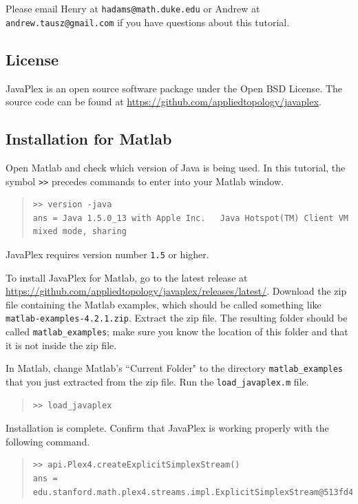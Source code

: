 \documentclass[amscd, amssymb, verbatim]{amsart}[12pt]
\theoremstyle{remark}
\theoremstyle{remark}
\theoremstyle{remark}
\begin{document}
Please email Henry at \texttt{hadams@math.duke.edu} or Andrew at \texttt{andrew.tausz@gmail.com} if you have questions about this tutorial.


\subsection{License}

JavaPlex is an open source software package under the Open BSD License. The source code can be found at \url{https://github.com/appliedtopology/javaplex}.


\subsection{Installation for Matlab}
Open Matlab and check which version of Java is being used. In this tutorial, the symbol \texttt{>>} precedes commands to enter into your Matlab window.

\begin{quote} \begin{verbatim} 
>> version -java
ans = Java 1.5.0_13 with Apple Inc.   Java Hotspot(TM) Client VM mixed mode, sharing
\end{verbatim} \end{quote}

JavaPlex requires version number \texttt{1.5} or higher. 

To install JavaPlex for Matlab, go to the latest release at \url{https://github.com/appliedtopology/javaplex/releases/latest/}. Download the zip file containing the Matlab examples, which should be called something like \texttt{matlab-examples-4.2.1.zip}. Extract the zip file. The resulting folder should be called \texttt{matlab\_examples}; make sure you know the location of this folder and that it is not inside the zip file.

In Matlab, change Matlab's ``Current Folder" to the directory \texttt{matlab\_examples} that you just extracted from the zip file. Run the \texttt{load\_javaplex.m} file. 

\begin{quote} \begin{verbatim} 
>> load_javaplex
\end{verbatim} \end{quote}

Installation is complete. Confirm that JavaPlex is working properly with the following command.

\begin{quote} \begin{verbatim}
>> api.Plex4.createExplicitSimplexStream()
ans = edu.stanford.math.plex4.streams.impl.ExplicitSimplexStream@513fd4
\end{verbatim} \end{quote}
\end{document}
